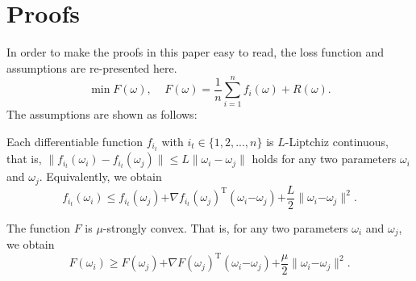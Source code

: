 \documentclass[letterpaper]{article}
\begin{document}
\section{Proofs}
\label{sect_proofs}
In order to make the proofs  in this paper easy to read, the loss function and assumptions are re-presented here. 
\begin{equation}
\label{equa_loss_minimization}
\min F(\omega),~~~~~F(\omega)=\frac{1}{n}\sum\limits_{i=1}^n f_i(\omega)+R(\omega).
\end{equation} The assumptions are shown as follows:


\begin{Assumption}
\label{assumption_liptchiz}
Each  differentiable function $f_{i_t}$ with $i_t\in\{1,2, ..., n\}$  is $L$-Liptchiz continuous, that is,  $\parallel  f_{i_t}(\omega_i) - f_{i_t}(\omega_j)  \parallel \le L \parallel \omega_i - \omega_j    \parallel$ holds for any two parameters $\omega_i$ and $\omega_j$. Equivalently, we obtain
$$
f_{i_t}(\omega_i)\le f_{i_t}(\omega_j)\mathrm{+}\nabla f_{i_t}(\omega_j)^\mathrm{T} (\omega_i\mathrm{-}\omega_j)\mathrm{+}\frac{L}{2}\parallel \omega_i\mathrm{-}\omega_j\parallel^2.
$$
\end{Assumption}

\begin{Assumption}
\label{assumption_strongly_convex}
The function $F$ is $\mu$-strongly convex. That is, for any two parameters $\omega_i$ and $\omega_j$, we obtain 
$$
F(\omega_i)\ge F(\omega_j)\mathrm{+}\nabla F(\omega_j)^\mathrm{T} (\omega_i\mathrm{-}\omega_j)\mathrm{+}\frac{\mu}{2}\parallel \omega_i\mathrm{-}\omega_j\parallel^2.
$$
\end{Assumption} 
\end{document}
